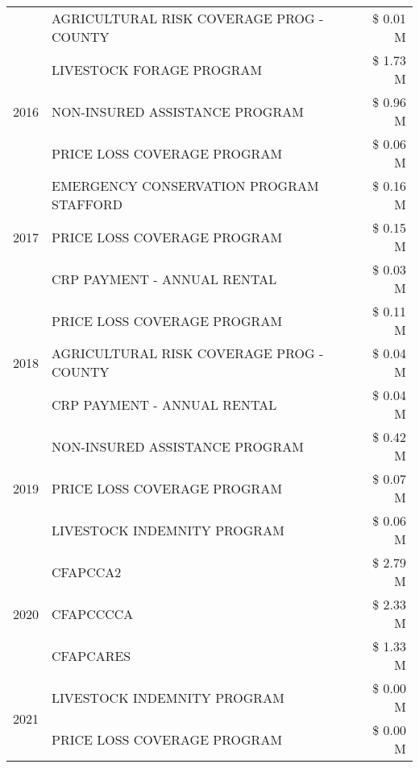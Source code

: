 \begin{tabular}{llr}
 & AGRICULTURAL RISK COVERAGE PROG - COUNTY & \$ 0.01 M \\
\cline{1-3}
\multirow[t]{3}{*}{2016} & LIVESTOCK FORAGE PROGRAM                      & \$ 1.73 M \\
 & NON-INSURED ASSISTANCE PROGRAM                & \$ 0.96 M \\
 & PRICE LOSS COVERAGE PROGRAM                   & \$ 0.06 M \\
\cline{1-3}
\multirow[t]{3}{*}{2017} & EMERGENCY CONSERVATION PROGRAM STAFFORD & \$ 0.16 M \\
 & PRICE LOSS COVERAGE PROGRAM & \$ 0.15 M \\
 & CRP PAYMENT - ANNUAL RENTAL & \$ 0.03 M \\
\cline{1-3}
\multirow[t]{3}{*}{2018} & PRICE LOSS COVERAGE PROGRAM & \$ 0.11 M \\
 & AGRICULTURAL RISK COVERAGE PROG - COUNTY & \$ 0.04 M \\
 & CRP PAYMENT - ANNUAL RENTAL & \$ 0.04 M \\
\cline{1-3}
\multirow[t]{3}{*}{2019} & NON-INSURED ASSISTANCE PROGRAM & \$ 0.42 M \\
 & PRICE LOSS COVERAGE PROGRAM & \$ 0.07 M \\
 & LIVESTOCK INDEMNITY PROGRAM & \$ 0.06 M \\
\cline{1-3}
\multirow[t]{3}{*}{2020} & CFAPCCA2 & \$ 2.79 M \\
 & CFAPCCCCA & \$ 2.33 M \\
 & CFAPCARES & \$ 1.33 M \\
\cline{1-3}
\multirow[t]{2}{*}{2021} & LIVESTOCK INDEMNITY PROGRAM & \$ 0.00 M \\
 & PRICE LOSS COVERAGE PROGRAM & \$ 0.00 M \\
\cline{1-3}
\bottomrule
\end{tabular}
